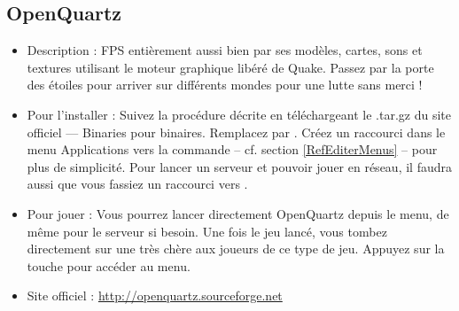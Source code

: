 \subsection{OpenQuartz}
\begin{itemize}
\begingroup
{}
\item Description : FPS entièrement  aussi bien par ses modèles, cartes, sons et textures utilisant le moteur graphique libéré de Quake. Passez par la porte des étoiles pour arriver sur différents mondes pour une lutte sans merci !{\par}
\endgroup
\item Pour l'installer : Suivez la procédure décrite en téléchargeant le .tar.gz du site officiel --- Binaries pour binaires. Remplacez  par . Créez un raccourci dans le menu Applications vers la commande  -- cf. section \ref{RefEditerMenus} -- pour plus de simplicité. Pour lancer un serveur et pouvoir jouer en réseau, il faudra aussi que vous fassiez un raccourci vers .{\par}
\item Pour jouer : Vous pourrez lancer directement OpenQuartz depuis le menu, de même pour le serveur si besoin. Une fois le jeu lancé, vous tombez directement sur une  très chère aux joueurs de ce type de jeu. Appuyez sur la touche  pour accéder au menu.{\par}
\item Site officiel : \url{http://openquartz.sourceforge.net}{\par}
\end{itemize}

